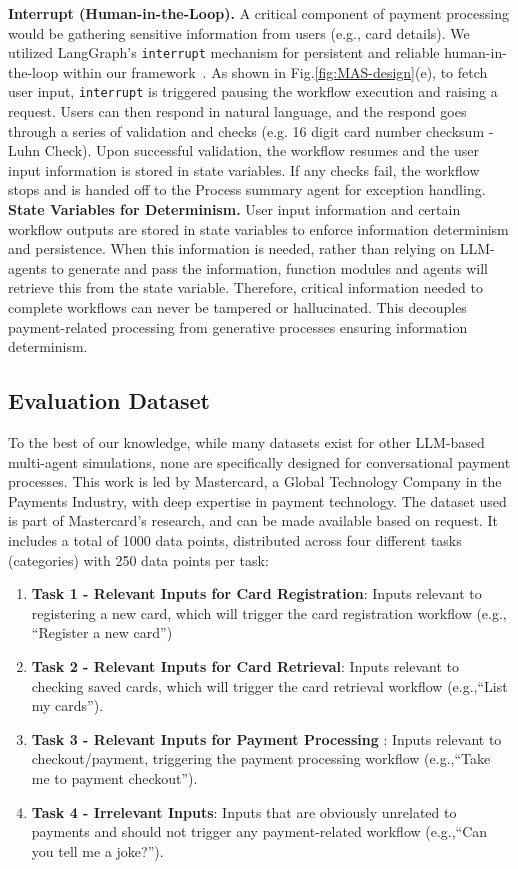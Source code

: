\documentclass[runningheads]{llncs}
\begin{document}
\noindent\textbf{Interrupt (Human-in-the-Loop).}
A critical component of payment processing would be gathering sensitive information from users (e.g., card details). We utilized LangGraph's \texttt{interrupt} mechanism for persistent and reliable human-in-the-loop within our framework~\cite{langchain2024langgraph}. As shown in Fig.\ref{fig:MAS-design}(e), to fetch user input, \texttt{interrupt} is triggered pausing the workflow execution and raising a request. Users can then respond in natural language, and the respond goes through a series of validation and checks (e.g. 16 digit card number checksum - Luhn Check). Upon successful validation, the workflow resumes and the user input information is stored in state variables. If any checks fail, the workflow stops and is handed off to the Process summary agent for exception handling.\\ 

\noindent\textbf{State Variables for Determinism.} 
User input information and certain workflow outputs are stored in state variables to enforce information determinism and persistence. 
When this information is needed, rather than relying on LLM-agents to generate and pass the information, function modules and agents will retrieve this from the state variable. Therefore, critical information needed to complete workflows can never be tampered or hallucinated. This decouples payment-related processing from generative processes ensuring information determinism.


\subsection{Evaluation Dataset}
To the best of our knowledge, while many datasets exist for other LLM-based multi-agent simulations, none are specifically designed for conversational payment processes. This work is led by Mastercard, a Global Technology Company in the Payments Industry, with deep expertise in payment technology. The dataset used is part of Mastercard’s research, and can be made available based on request. 
It includes a total of 1000 data points, distributed across four different tasks (categories) with 250 data points per task: 
\begin{enumerate}
    \item \textbf{Task 1 - Relevant Inputs for Card Registration}: Inputs relevant to registering a new card, which will trigger the card registration workflow (e.g., ``Register a new card'')
    \item \textbf{Task 2 - Relevant Inputs for Card Retrieval}: Inputs relevant to checking saved cards, which will trigger the card retrieval workflow (e.g.,``List my cards'').
    \item \textbf{Task 3 - Relevant Inputs for Payment Processing
    }: Inputs relevant to checkout/payment, triggering the payment processing workflow (e.g.,``Take me to payment checkout'').
    \item \textbf{Task 4 - Irrelevant Inputs}: Inputs that are obviously unrelated to payments and should not trigger any payment-related workflow (e.g.,``Can you tell me a joke?''). 
\end{enumerate}
\end{document}
